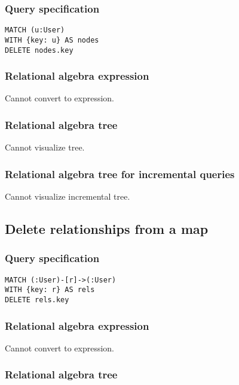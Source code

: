 \subsubsection*{Query specification}

\begin{lstlisting}
MATCH (u:User)
WITH {key: u} AS nodes
DELETE nodes.key
\end{lstlisting}

\subsubsection*{Relational algebra expression}

Cannot convert to expression.

\subsubsection*{Relational algebra tree}

Cannot visualize tree.

\subsubsection*{Relational algebra tree for incremental queries}

Cannot visualize incremental tree.

\subsection{Delete relationships from a map}

\subsubsection*{Query specification}

\begin{lstlisting}
MATCH (:User)-[r]->(:User)
WITH {key: r} AS rels
DELETE rels.key
\end{lstlisting}

\subsubsection*{Relational algebra expression}

Cannot convert to expression.

\subsubsection*{Relational algebra tree}

